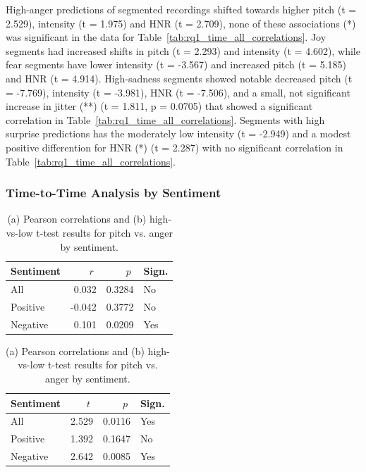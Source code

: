   High-anger predictions of segmented recordings shifted towards higher pitch (t = 2.529), intensity (t = 1.975) and HNR (t = 2.709), none of these associations (*) was significant in the data for Table~\ref{tab:rq1_time_all_correlations}. 
  Joy segments had increased shifts in pitch (t = 2.293) and intensity (t = 4.602), while fear segments have lower intensity (t = -3.567) and increased pitch (t = 5.185) and HNR (t = 4.914). 
  High-sadness segments showed notable decreased pitch (t = -7.769), intensity (t = -3.981), HNR (t = -7.506), and a small, not significant increase in jitter (**) (t = 1.811, p = 0.0705) that showed a significant correlation in Table~\ref{tab:rq1_time_all_correlations}.
  Segments with high surprise predictions has the moderately low intensity (t = -2.949) and a modest positive differention for HNR (*) (t = 2.287) with no significant correlation in Table~\ref{tab:rq1_time_all_correlations}. 
  

  \subsubsection{Time-to-Time Analysis by Sentiment}
  \begin{table}[H]
    \centering
    \begin{subtable}{0.45\textwidth}
      \centering
      \caption{Pitch and Anger (Pearson r)}\label{tab:rq1_corr_pitch_anger}
      \begin{tabular}{l r r l}
        \toprule
        Sentiment & \(\;r\;\) & \(\;p\;\) & Sign. \\
        \midrule
        All        &  0.032        & 0.3284    & No          \\
        Positive   & -0.042        & 0.3772    & No          \\
        Negative   &  0.101        & 0.0209    & Yes         \\
        \bottomrule
      \end{tabular}
    \end{subtable}\hfill
    \begin{subtable}{0.45\textwidth}
      \centering
      \caption{Pitch and Anger (t-test)}\label{tab:rq1_ttest_pitch_anger}
      \begin{tabular}{l r r l}
        \toprule
        Sentiment & \(\;t\;\) & \(\;p\;\) & Sign. \\
        \midrule
        All        &  2.529      & 0.0116    & Yes         \\
        Positive   &  1.392      & 0.1647    & No          \\
        Negative   &  2.642      & 0.0085    & Yes         \\
        \bottomrule
      \end{tabular}
    \end{subtable}
    \caption{(a) Pearson correlations and (b) high-vs-low t-test results for pitch vs. anger by sentiment.}
    \label{tab:rq1_pitch_anger_side_by_side}
  \end{table}
  
